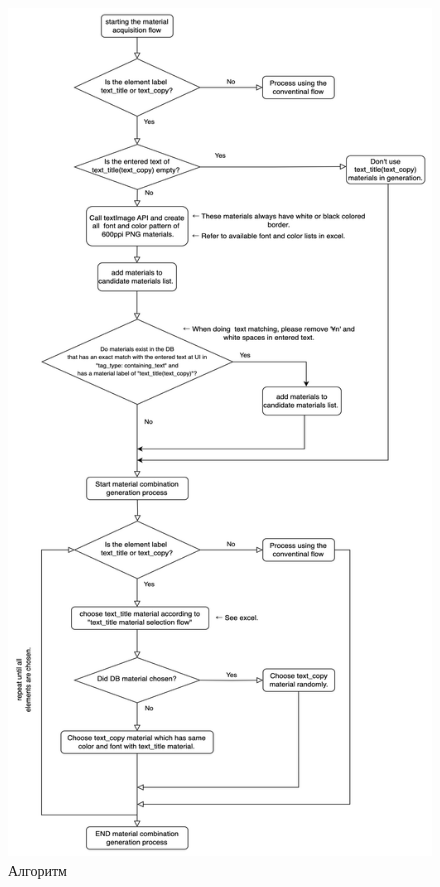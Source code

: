 \begin{figure}
	\centering
	\includegraphics[scale=0.6]{src/pictures/algorithm1.png}
	\caption{Алгоритм}
\end{figure}
